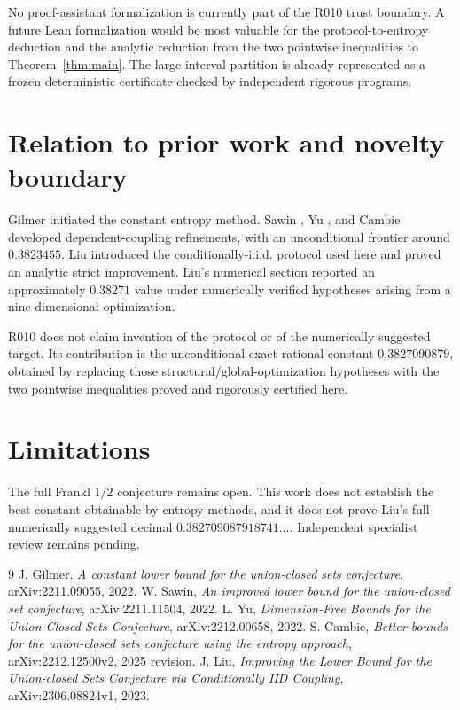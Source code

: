 \documentclass[11pt]{article}
\begin{document}
No proof-assistant formalization is currently part of the R010 trust boundary.
A future Lean formalization would be most valuable for the protocol-to-entropy
deduction and the analytic reduction from the two pointwise inequalities to
Theorem~\ref{thm:main}. The large interval partition is already represented as
a frozen deterministic certificate checked by independent rigorous programs.

\section{Relation to prior work and novelty boundary}

Gilmer \cite{Gilmer2022} initiated the constant entropy method. Sawin
\cite{Sawin2022}, Yu \cite{Yu2022}, and Cambie \cite{Cambie2025} developed
dependent-coupling refinements, with an unconditional frontier around
$0.3823455$. Liu \cite{Liu2023} introduced the conditionally-i.i.d. protocol
used here and proved an analytic strict improvement. Liu's numerical section
reported an approximately $0.38271$ value under numerically verified
hypotheses arising from a nine-dimensional optimization.

R010 does not claim invention of the protocol or of the numerically suggested
target. Its contribution is the unconditional exact rational constant
$0.3827090879$, obtained by replacing those structural/global-optimization
hypotheses with the two pointwise inequalities proved and rigorously certified
here.

\section{Limitations}

The full Frankl $1/2$ conjecture remains open. This work does not establish the
best constant obtainable by entropy methods, and it does not prove Liu's full
numerically suggested decimal $0.382709087918741\ldots$. Independent
specialist review remains pending.

\begin{thebibliography}{9}
 J. Gilmer, \emph{A constant lower bound for the union-closed sets conjecture}, arXiv:2211.09055, 2022.
 W. Sawin, \emph{An improved lower bound for the union-closed set conjecture}, arXiv:2211.11504, 2022.
 L. Yu, \emph{Dimension-Free Bounds for the Union-Closed Sets Conjecture}, arXiv:2212.00658, 2022.
 S. Cambie, \emph{Better bounds for the union-closed sets conjecture using the entropy approach}, arXiv:2212.12500v2, 2025 revision.
 J. Liu, \emph{Improving the Lower Bound for the Union-closed Sets Conjecture via Conditionally IID Coupling}, arXiv:2306.08824v1, 2023.
\end{thebibliography}
\end{document}

